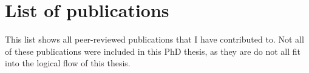 \chapter{List of publications}
\label{chp:Publicationlist}

This list shows all peer-reviewed publications that I have contributed to. Not all of these publications were included in this PhD thesis, as they are do not all fit into the logical flow of this thesis.\\

\\

\\

\\

\\

\\

\\

\\

\\

\\

\\

\\

\\

\\